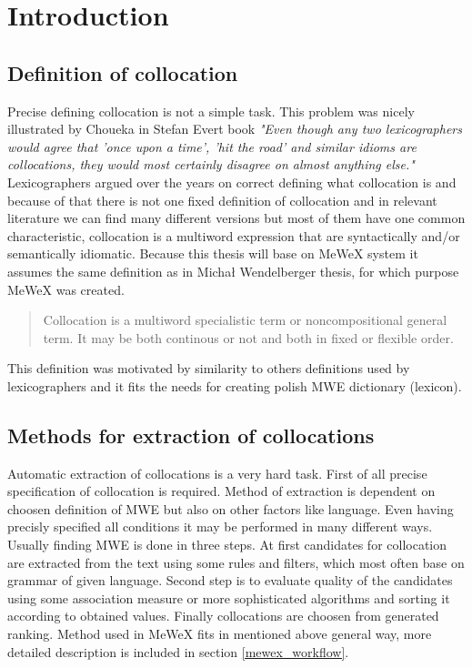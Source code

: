 
\chapter{Introduction}

\section{Definition of collocation}


Precise defining collocation is not a simple task. This problem was nicely illustrated by Choueka in Stefan Evert book 
\textit{"Even though any two lexicographers would agree that ’once upon a time’, ’hit the road’ and similar idioms are collocations,
they would most certainly disagree on almost anything else."}
Lexicographers argued over the years on correct defining what collocation is and because of that there is not one fixed definition of collocation  
and in relevant literature we can find many different versions but most of them have one common characteristic, 
collocation is a multiword expression that are syntactically and/or semantically idiomatic. Because this thesis will base on MeWeX system 
it assumes the same definition as in Michał Wendelberger thesis, for which purpose MeWeX was created.
\begin{quote}
    Collocation is a multiword specialistic term or noncompositional general term. 
    It may be both continous or not and both in fixed or flexible order.
    \cite{mgr}
\end{quote}
This definition was motivated by similarity to others definitions used by lexicographers and it fits the needs for creating polish MWE dictionary (lexicon). 

\section{Methods for extraction of collocations}
Automatic extraction of collocations is a very hard task. First of all precise specification of collocation is required.
Method of extraction is dependent on choosen definition of MWE but also on other factors like language. 
Even having precisly specified all conditions it may be performed in many different ways. 
Usually finding MWE is done in three steps. At first candidates for collocation are extracted from the text using some rules and filters, 
which most often base on grammar of given language. Second step is to evaluate quality of the candidates 
using some association measure or more sophisticated algorithms and sorting it according to obtained values. 
Finally collocations are choosen from generated ranking. Method used in MeWeX fits in mentioned above general way, 
more detailed description is included in section \ref{mewex_workflow}.

